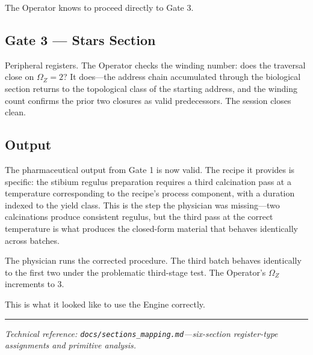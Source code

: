 \documentclass[12pt,a4paper]{article}
\begin{document}
The Operator knows to proceed directly to Gate 3.

\subsection*{Gate 3 --- Stars Section}

Peripheral registers. The Operator checks the winding number: does the traversal close on $\Omega_Z = 2$? It does---the address chain accumulated through the biological section returns to the topological class of the starting address, and the winding count confirms the prior two closures as valid predecessors. The session closes clean.

\subsection*{Output}

The pharmaceutical output from Gate 1 is now valid. The recipe it provides is specific: the stibium regulus preparation requires a third calcination pass at a temperature corresponding to the recipe's process component, with a duration indexed to the yield class. This is the step the physician was missing---two calcinations produce consistent regulus, but the third pass at the correct temperature is what produces the closed-form material that behaves identically across batches.

The physician runs the corrected procedure. The third batch behaves identically to the first two under the problematic third-stage test. The Operator's $\Omega_Z$ increments to 3.

This is what it looked like to use the Engine correctly.

\bigskip\hrule\bigskip

\noindent\small\textit{Technical reference: \texttt{docs/sections\_mapping.md}---six-section register-type assignments and primitive analysis.}
\end{document}
